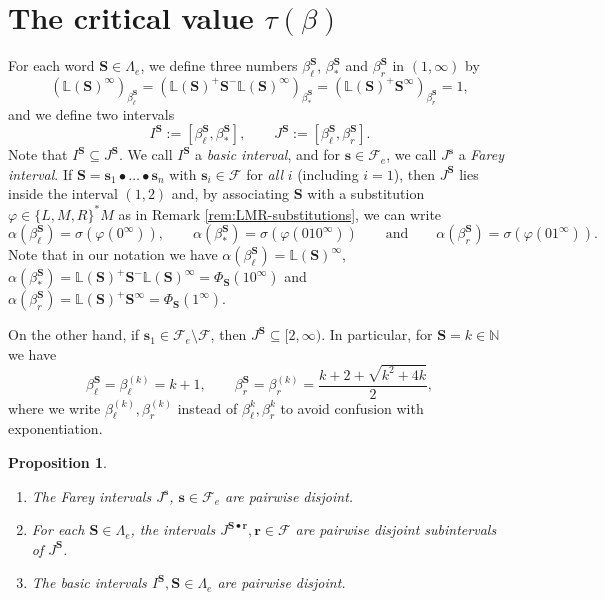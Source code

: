 \documentclass[12pt]{amsart}
\newtheorem{proposition}[theorem]{Proposition}
\theoremstyle{definition}
\theoremstyle{remark}
\numberwithin{equation}{section}
\newcommand{\N}{\ensuremath{\mathbb{N}}}
\renewcommand{\L}{\ensuremath{\mathbb{L}}}
\newcommand{\cF}{\mathcal{F}}
\newcommand{\s}{ {\mathbf{s}}}
\newcommand{\cs}{ {\mathbf{S}}}
\renewcommand{\r}{ {\mathbf{r}}}
\newcommand{\f}{\infty}
\newcommand{\al}{\alpha}
\newcommand{\si}{\sigma}
\newcommand{\La}{\Lambda}
\begin{document}
{\section{The critical value $\tau(\beta)$} \label{sec:critical-value}

For each word $\cs\in\La_e$, we define three numbers $\beta_\ell^\cs$, $\beta_*^\cs$ and $\beta_r^\cs$ in $(1,\f)$ by
\[
(\L(\cs)^\f)_{\beta_\ell^\cs}=(\L(\cs)^+\cs^-\L(\cs)^\f)_{\beta_*^\cs}=(\L(\cs)^+\cs^\f)_{\beta_r^{\cs}}=1,
\]
and we define two intervals 
\[
I^\cs:=[\beta_\ell^\cs,\beta_*^\cs], \qquad J^\cs:=[\beta_\ell^\cs,\beta_r^\cs].
\]
Note that $I^\cs\subseteq J^\cs$. We call $I^\cs$ a {\em basic interval}, and for $\s\in\cF_e$, we call $J^\s$ a {\em Farey interval}. If $\cs=\s_1\bullet\dots\bullet \s_n$ with $\s_i\in\cF$ for {\em all} $i$ (including $i=1$), then $J^\cs$ lies inside the interval $(1,2)$ and, by associating $\cs$ with a substitution $\varphi\in\{L,M,R\}^*M$ as in Remark \ref{rem:LMR-substitutions}, we can write 
\[
\al(\beta_\ell^\cs)=\si(\varphi(0^\f)), \qquad \al(\beta_*^\cs)=\si(\varphi(010^\f)) \qquad \mbox{and} \qquad \al(\beta_r^\cs)=\si(\varphi(01^\f)).
\]
Note that in our notation we have $\al(\beta_\ell^\cs)=\L(\cs)^\f$, $\al(\beta_*^\cs)=\L(\cs)^+\cs^-\L(\cs)^\f=\Phi_\cs(10^\f)$ and $\al(\beta_r^\cs)=\L(\cs)^+\cs^\f=\Phi_\cs(1^\f)$.

On the other hand, if $\s_1\in\cF_e\setminus\cF$, then $J^\cs\subseteq [2,\f)$. In particular, for $\cs=k\in\N$ we have 
\[
\beta_\ell^\cs=\beta_\ell^{(k)}=k+1, \qquad \beta_r^\cs=\beta_r^{(k)}=\frac{k+2+\sqrt{k^2+4k}}{2},
\]
where we write $\beta_\ell^{(k)}, \beta_r^{(k)}$ instead of $\beta_\ell^k,\beta_r^k$ to avoid confusion with exponentiation.

\begin{proposition} \label{prop:disjoint}\mbox{}
\begin{enumerate} [{\rm(i)}]
\item The Farey intervals $J^\s$, $\s\in\cF_e$ are pairwise disjoint.
\item For each $\cs\in\La_e$, the intervals $J^{\cs\bullet\r}, \r\in\cF$ are pairwise disjoint subintervals of $J^\cs$.
\item The basic intervals $I^\cs, \cs\in\La_e$ are pairwise disjoint.
\end{enumerate}
\end{proposition}

}
\end{document}
